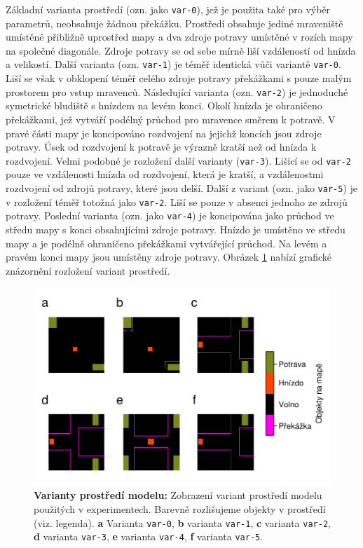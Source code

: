 \documentclass[10pt,a4paper,twocolumn]{article}
\begin{document}
Základní varianta prostředí (ozn. jako \texttt{var-0}), jež je použita 
také pro výběr parametrů, neobsahuje žádnou překážku. Prostředí obsahuje 
jediné mraveniště umístěné přibližně uprostřed mapy a dva zdroje potravy
umístěné v rozích mapy na společné diagonále. Zdroje potravy se od sebe 
mírně liší vzdáleností od hnízda a velikostí. Další varianta 
(ozn. \texttt{var-1}) je téměř identická vůči variantě
\texttt{var-0}. Liší se však v obklopení téměř celého zdroje
potravy překážkami s pouze malým prostorem pro vstup mravenců. Následující
varianta (ozn. \texttt{var-2}) je jednoduché symetrické bludiště s hnízdem 
na levém konci. Okolí hnízda je ohraničeno překážkami, jež vytváří podélný 
průchod pro mravence směrem k potravě. V pravé části mapy je koncipováno 
rozdvojení na jejichž koncích jsou zdroje potravy. Úsek od rozdvojení
k potravě je výrazně kratší než od hnízda k rozdvojení. Velmi podobné je 
rozložení další varianty (\texttt{var-3}). Lišící se od \texttt{var-2} pouze ve 
vzdálenosti hnízda od rozdvojení, která je kratší, a vzdálenostmi rozdvojení od 
zdrojů potravy, které jsou delší. Další z variant (ozn. jako \texttt{var-5})
je v rozložení téměř totožná jako \texttt{var-2}. Liší se pouze v absenci jednoho
ze zdrojů potravy. Poslední varianta (ozn. jako
\texttt{var-4}) je koncipována jako průchod ve středu mapy s konci 
obsahujícími zdroje potravy. Hnízdo je umístěno ve středu mapy a je 
podélně ohraničeno překážkami vytvářející průchod. Na levém a pravém konci
mapy jsou umístěny zdroje potravy. Obrázek \ref{fig:map_variants}
nabízí grafické znázornění rozložení variant prostředí.
 

\begin{figure}[tb]
  \centering
  \includegraphics[width=0.98\linewidth]{images/maze_variants.pdf}
  \caption{\textbf{Varianty prostředí modelu:} 
  Zobrazení variant prostředí modelu použitých v experimentech. 
  Barevně rozlišujeme objekty v prostředí (viz. legenda).
  \textbf{a} Varianta \texttt{var-0}, 
  \textbf{b} varianta \texttt{var-1},
  \textbf{c} varianta \texttt{var-2},
  \textbf{d} varianta \texttt{var-3},
  \textbf{e} varianta \texttt{var-4},
  \textbf{f} varianta \texttt{var-5}.}
  \label{fig:map_variants}
\end{figure} 
\end{document}

